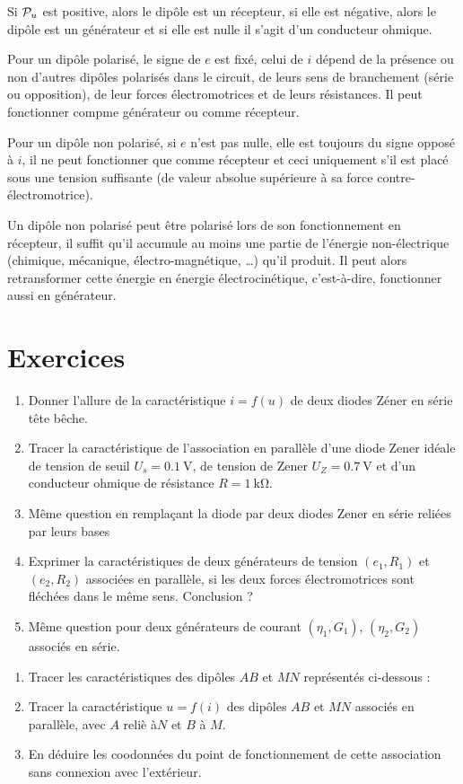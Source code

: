 Si $\P_u$ est positive, alors le dipôle est un récepteur, si elle est négative, alors le dipôle est un générateur et si elle est nulle il s'agit d'un conducteur ohmique.

Pour un dipôle polarisé, le signe de $e$ est fixé, celui de $i$ dépend de la présence ou non d'autres dipôles polarisés dans le circuit, de leurs sens de branchement (série ou opposition), de leur forces électromotrices et de leurs résistances. Il peut fonctionner compme générateur ou comme récepteur.

Pour un dipôle non polarisé, si $e$ n'est pas nulle, elle est toujours du signe opposé à $i$, il ne peut fonctionner que comme récepteur et ceci uniquement s'il est placé sous une tension suffisante (de valeur absolue supérieure à sa force contre-électromotrice).

Un dipôle non polarisé peut être polarisé lors de son fonctionnement en récepteur, il suffit qu'il accumule au moins une partie de l'énergie non-électrique (chimique, mécanique, électro-magnétique, \ldots) qu'il produit. Il peut alors retransformer cette énergie en énergie électrocinétique, c'est-à-dire, fonctionner aussi en générateur.

\section{Exercices}
\begin{exercice}
	\begin{enumerate}
		\item Donner l'allure de la caractéristique $i=f(u)$ de deux diodes Zéner en série tête bêche.
		\item Tracer la caractéristique de l'association en parallèle d'une diode Zener idéale de tension de seuil $U_s=\SI{0.1}{\volt}$, de tension de Zener $U_Z = \SI{0.7}{\volt}$ et d'un conducteur ohmique de résistance $R=\SI{1}{\kilo\ohm}$.
		\item Même question en remplaçant la diode par deux diodes Zener en série reliées par leurs bases
		\item Exprimer la caractéristiques de deux générateurs de tension $(e_1, R_1)$ et $(e_2, R_2)$ associées en parallèle, si les deux forces électromotrices sont fléchées dans le même sens. Conclusion ?
		\item Même question pour deux générateurs de courant $(\eta_1, G_1)$, $(\eta_2, G_2)$ associés en série.
	\end{enumerate}
\end{exercice}
\begin{exercice}
	\begin{enumerate}
		\item Tracer les caractéristiques des dipôles $AB$ et $MN$ représentés ci-dessous :
		\item Tracer la caractéristique $u=f(i)$ des dipôles $AB$ et $MN$ associés en parallèle, avec $A$ reliè à$N$ et $B$ à $M$.
		\item En déduire les coodonnées du point de fonctionnement de cette association sans connexion avec l'extérieur.
	\end{enumerate}
\end{exercice}
		
